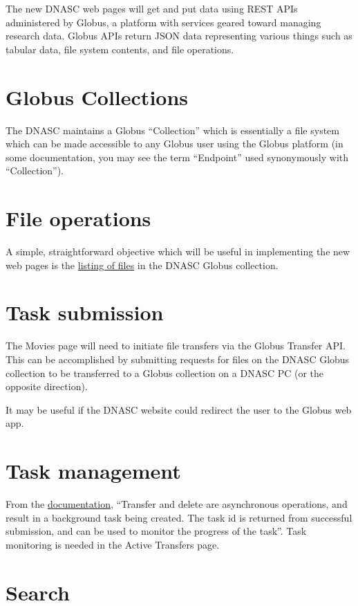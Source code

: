 
The new DNASC web pages will get and put data using REST APIs administered by Globus, a platform with services geared toward managing research data. Globus APIs return JSON data representing various things such as tabular data, file system contents, and file operations.
\section{Globus Collections}
The DNASC maintains a Globus “Collection” which is essentially a file system which can be made accessible to any Globus user using the Globus platform (in some documentation, you may see the term “Endpoint” used synonymously with “Collection”).

\section{File operations}
A simple, straightforward objective which will be useful in implementing the new web pages is the \href{\urlglobusfilelisting}{listing of files} in the DNASC Globus collection.

\section{Task submission}
The Movies page will need to initiate file transfers via the Globus Transfer API. This can be accomplished by submitting requests for files on the DNASC Globus collection to be transferred to a Globus collection on a DNASC PC (or the opposite direction).

It may be useful if the DNASC website could redirect the user to the Globus web app.

\section{Task management}
From the \href{\urlglobustaskmonitoring}{\uline{documentation}}, “Transfer and delete are asynchronous operations, and result in a background task being created. The task id is returned from successful submission, and can be used to monitor the progress of the task”. Task monitoring is needed in the Active Transfers page.

\section{Search}

